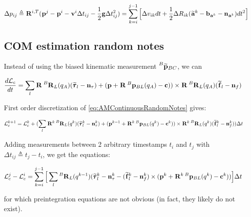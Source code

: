 \documentclass[11pt]{article}
\newcommand{\Rot}[2]{\prescript{#1}{}{\bfR}_{#2}}
\newcommand{\noise}{\bfn}
\newcommand{\bias}{\bfb}
\newcommand{\posi}[2]{\prescript{#1}{}{\bfp}_{#2}}
\newcommand{\posim}[2]{\prescript{#1}{}{\widetilde{\bfp}}_{#2}}
\newcommand{\vel}[2]{\prescript{#1}{}{\bfv}_{#2}}
\newcommand{\acc}[2]{\prescript{#1}{}{\bfa}_{#2}}
\newcommand{\accm}[2]{\prescript{#1}{}{\widetilde{\bfa}}_{#2}}
\newcommand{\forcem}[2]{\prescript{#1}{}{\widetilde{\bff}}_{#2}}
\newcommand{\torquem}[2]{\prescript{#1}{}{\widetilde{\pmb{\tau}}}_{#2}}
\newcommand{\AM}{\mathcal{L}}
\newcommand{\COM}{\bfc}
\newcommand{\grav}{\bfg}
\begin{document}
\begin{equation}
    \Delta p_{ij} \triangleq \Rot{}{}^{i,T}(\posi{}{}^j - \posi{}{}^i - \vel{}{}^i \Delta t_{ij} - \frac{1}{2} \grav \Delta t_{ij}^2) = \sum_{k=i}^{j-1} \Big[\Delta v_{ik}dt +  \frac{1}{2} \Delta R_{ik} (\accm{}{}^k - \bias_{\acc{}{}^k} - \noise_{\acc{}{}^k})dt^2 \Big]
\end{equation}


\subsection{COM estimation random notes}

Instead of using the biased kinematic measurement $\posim{B}{BC}$, we can 

\begin{equation}
\begin{split}
\frac{d\AM_c}{dt}&= \sum_l \Rot{}{}\Rot{B}{L}(q_A)(\torquem{}{l} - \noise_{\tau}) + (\bfp +
\Rot{}{}\posi{B}{BL}(q_A) - \COM)) \times \Rot{}{}\Rot{B}{L}(q_A)(\forcem{}{l} - \noise_f)
\end{split}
\label{eq:AMContinuousRandomNotes}
\end{equation}

First order discretization of \ref{eq:AMContinuousRandomNotes} gives:

\begin{equation}
\begin{split}
\AM_c^{k+1} &= \AM_c^{k} +  ( 
\sum_l \Rot{}{}^{k}\Rot{B}{L}(q^{k})(\torquem{}{l}^{k} - \noise_{\tau}^{k}) + (\bfp^{k-1} +
\Rot{}{}^{k}\posi{B}{BL}(q^{k}) - \COM^{k})) \times \Rot{}{}^{k}\Rot{B}{L}(q^{k})(\forcem{}{l}^{k} - \noise_f^{k}) 
) \Delta t
\end{split}
\end{equation}



Adding measurements between 2 arbitrary timestamps \(t_i\) and \(t_j\) with \(\Delta t_{ij} \triangleq t_j - t_i\), we get the equations:

\begin{equation}
\begin{split}
\AM_c^{j} - \AM_c^{i} &=  \sum_{k=i}^{j-1} \Big[ 
\sum_l \Rot{B}{L}(q^{k-1}) (\torquem{}{l}^{k} - \noise_{\tau}^{k} - (\forcem{}{l}^{k} - \noise_f^{k}) \times (\bfp^{k} + \Rot{}{}^{k}\posi{B}{BL}(q^{k}) - \COM^{k})) \Big]  \Delta t
\end{split}
\end{equation}


for which preintegration equations are not obvious (in fact, they likely do not exist).
\end{document}
